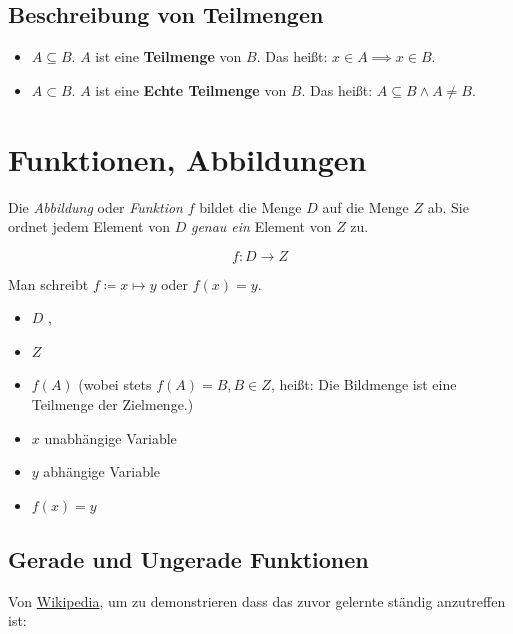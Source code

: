 \subsection{Beschreibung von Teilmengen}
\begin{itemize}
    \item $A\subseteq B$. $A$ ist eine \textbf{Teilmenge} von $B$. Das heißt: $x \in A \implies x \in B$.
    \item $A\subset B$. $A$ ist eine \textbf{Echte Teilmenge} von $B$. Das heißt: $A\subseteq B \land A \neq B $.
\end{itemize}


\section{Funktionen, Abbildungen}
\label{sec:funktionen}

Die \emph{Abbildung} oder \emph{Funktion} $f$ bildet die Menge $D$ auf die Menge $Z$ ab. Sie ordnet jedem Element von $D$ \emph{genau ein} Element von $Z$ zu.

    $$ f : D \to Z$$

Man schreibt $f\coloneqq x \mapsto y$ oder $f(x) = y$.

\begin{itemize}
    \item $D$ , 
    \item $Z$ 
    \item $f(A)$  (wobei stets $f(A)=B, B \in Z$, heißt: Die Bildmenge ist eine Teilmenge der Zielmenge.)
    \item $x$ unabhängige Variable
    \item $y$ abhängige Variable
    \item $f(x) = y$ 
\end{itemize}



\subsection{Gerade und Ungerade Funktionen}\label{subsec:geradeUngerade}
Von \href{https://de.wikipedia.org/wiki/Gerade\_und\_ungerade\_Funktionen}{Wikipedia}, um zu demonstrieren dass das zuvor gelernte ständig anzutreffen ist:

